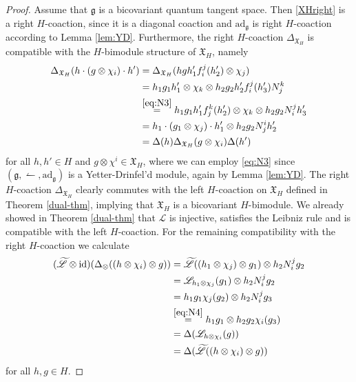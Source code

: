 \documentclass{article}
\theoremstyle{definition}
\begin{document}
\begin{proof}
		Assume that $\mathfrak{g}$ is a bicovariant quantum tangent space. Then \eqref{XHright} is a right $H$-coaction, since it is a diagonal coaction and $\mathrm{ad}_\mathfrak{g}$ is right $H$-coaction according to Lemma \ref{lem:YD}.
		Furthermore, the right $H$-coaction $\Delta_{\mathfrak{X}_H}$ is compatible with the $H$-bimodule structure of $\mathfrak{X}_H$, namely
		\begin{align*}
			\Delta_{\mathfrak{X}_H}(h\cdot(g\otimes\chi_i)\cdot h')
			&=\Delta_{\mathfrak{X}_H}(hgh'_1f_i^j(h'_2)\otimes\chi_j)\\
			&=h_1g_1h'_1\otimes\chi_k\otimes h_2g_2h'_2f_i^j(h'_3)N^k_j\\
			&\overset{\eqref{eq:N3}}{=}h_1g_1h'_1f^k_j(h'_2)\otimes\chi_k\otimes h_2g_2N^j_ih'_3\\
			&=h_1\cdot(g_1\otimes\chi_j)\cdot h'_1\otimes h_2g_2N^i_jh'_2\\
			&=\Delta(h)\Delta_{\mathfrak{X}_H}(g\otimes\chi_i)\Delta(h')
		\end{align*}
		for all $h,h'\in H$ and $g\otimes\chi^i\in\mathfrak{X}_H$, where we can employ \eqref{eq:N3} since $(\mathfrak{g},\leftharpoonup,\mathrm{ad}_\mathfrak{g})$ is a Yetter-Drinfel'd module, again by Lemma \ref{lem:YD}. The right $H$-coaction $\Delta_{\mathfrak{X}_H}$ clearly commutes with the left $H$-coaction on $\mathfrak{X}_H$ defined in Theorem \ref{dual-thm}, implying that $\mathfrak{X}_H$ is a bicovariant $H$-bimodule. We already showed in Theorem \ref{dual-thm} that $\mathscr{L}$ is injective, satisfies the Leibniz rule and is compatible with the left $H$-coaction. For the remaining compatibility with the right $H$-coaction we calculate
		\begin{align*}
			(\widetilde{\mathscr{L}}\otimes\mathrm{id})(\Delta_\otimes((h\otimes\chi_i)\otimes g))
			&=\widetilde{\mathscr{L}}((h_1\otimes\chi_j)\otimes g_1)\otimes h_2N^j_ig_2\\
			&=\mathscr{L}_{h_1\otimes\chi_j}(g_1)\otimes h_2N^j_ig_2\\
			&=h_1g_1\chi_j(g_2)\otimes h_2N^j_ig_3\\
			&\overset{\eqref{eq:N4}}{=}h_1g_1\otimes h_2g_2\chi_i(g_3)\\
			&=\Delta(\mathscr{L}_{h\otimes\chi_i}(g))\\
			&=\Delta(\widetilde{\mathscr{L}}((h\otimes\chi_i)\otimes g))
		\end{align*}
		for all $h,g\in H$.
		

\end{proof}
\end{document}
